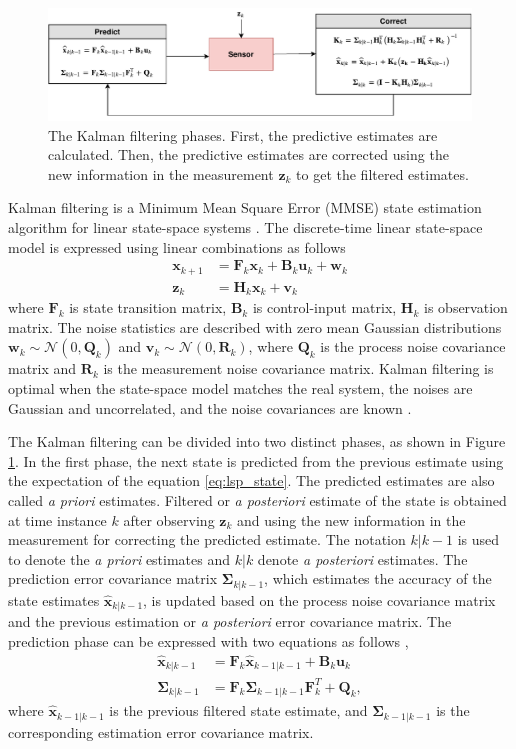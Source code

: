 \documentclass[english, 12pt, a4paper, elec, utf8, a-1b, online]{aaltothesis}
\numberwithin{equation}{section}
\renewcommand{\vec}[1]{\mathbf{#1}}
\newcommand{\xprior}{\hat{\vec{x}}_{k|k-1}}
\newcommand{\xlast}{\hat{\vec{x}}_{k-1|k-1}}
\newcommand{\priorecov}{\boldsymbol{\Sigma}_{k|k-1}}
\newcommand{\lastecov}{\boldsymbol{\Sigma}_{k-1|k-1}}
\newcommand{\x}{\vec{x}_k}
\newcommand{\xnext}{\vec{x}_{k+1}}
\newcommand{\z}{\vec{z}_k}
\newcommand{\stmodel}{\vec{F}_k}
\newcommand{\cimodel}{\vec{B}_k}
\newcommand{\cinput}{\vec{u}_k}
\newcommand{\pnoise}{\vec{w}_k}
\newcommand{\omodel}{\vec{H}_k}
\newcommand{\onoise}{\vec{v}_k}
\newcommand{\ocov}{\vec{R}_k}
\newcommand{\pcov}{\vec{Q}_k}
\newcommand{\normal}[2]{\mathcal{N}\left(#1, #2 \right)}
\def\prior{\textit{a priori}}
\def\post{\textit{a posteriori}}
\begin{document}
\begin{figure}[b]
    \centering
    \includegraphics[width=\textwidth]{figures/KF.pdf}
    \caption{The Kalman filtering phases.
    First, the predictive estimates are calculated.
    Then, the predictive estimates are corrected using the new information in the measurement $\z$ to get the filtered estimates.
    }
    \label{fig:KF}
\end{figure}

Kalman filtering is a Minimum Mean Square Error (MMSE) state estimation algorithm for linear state-space systems \cite{Zarchan2000}.
The discrete-time linear state-space model is expressed using linear combinations as follows \cite{Zarchan2000}
\begin{align}
    \xnext &= \stmodel \x + \cimodel \cinput + \pnoise \label{eq:lsp_state} \\
    \z &= \omodel \x + \onoise \label{eq:lsp_obs}
\end{align}
where $\stmodel$ is state transition matrix, $\cimodel$ is control-input matrix, $ \omodel $ is observation matrix. 
The noise statistics are described with zero mean Gaussian distributions $\pnoise \sim \normal{0}{\pcov}$ and $\onoise \sim \normal{0}{\ocov}$, where $\pcov$ is the process noise covariance matrix and $\ocov$ is the measurement noise covariance matrix.
Kalman filtering is optimal when the state-space model matches the real system, the noises are Gaussian and uncorrelated, and the noise covariances are known \cite{Zarchan2000}.

The Kalman filtering can be divided into two distinct phases, as shown in Figure \ref{fig:KF}.
In the first phase, the next state is predicted from the previous estimate using the expectation of the equation \eqref{eq:lsp_state}.
The predicted estimates are also called \prior{} estimates.
Filtered or \post{} estimate of the state is obtained at time instance $k$ after observing $\z$ and using the new information in the measurement for correcting the predicted estimate. 
The notation $k|k-1$ is used to denote the \prior{} estimates and $k|k$ denote \post{} estimates.
The prediction error covariance matrix $\priorecov$, which estimates the accuracy of the state estimates $\xprior$, is updated based on the process noise covariance matrix and the previous estimation or \post{} error covariance matrix.
The prediction phase can be expressed with two equations as follows \cite{Zarchan2000},
\begin{align}
    \xprior &= \stmodel \xlast + \cimodel \cinput \label{eq:kf_pred_x} \\ 
    \priorecov &= \stmodel \lastecov \stmodel^T + \pcov \label{eq:kf_prior_error_cov},
\end{align}
where $\xlast$ is the previous filtered state estimate, and $\lastecov$ is the corresponding estimation error covariance matrix.
\end{document}
